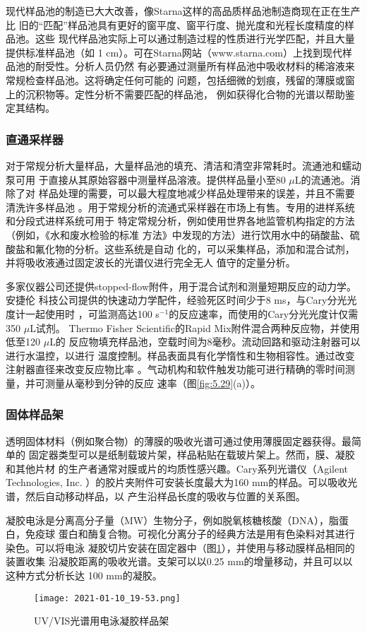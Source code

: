 现代样品池的制造已大大改善，像Starna这样的高品质样品池制造商现在正在生产比
旧的“匹配”样品池具有更好的窗平度、窗平行度、抛光度和光程长度精度的样品池。这些
现代样品池实际上可以通过制造过程的性质进行光学匹配，并且大量提供标准样品池（如
1 cm）。可在Starna网站（www.starna.com）上找到现代样品池的耐受性。分析人员仍然
有必要通过测量所有样品池中吸收材料的稀溶液来常规检查样品池。这将确定任何可能的
问题，包括细微的划痕，残留的薄膜或窗上的沉积物等。定性分析不需要匹配的样品池，
例如获得化合物的光谱以帮助鉴定其结构。
\subsubsection{直通采样器}
对于常规分析大量样品，大量样品池的填充、清洁和清空非常耗时。流通池和蠕动泵可用
于直接从其原始容器中测量样品溶液。提供样品量小至80 $\mu$L的流通池。消除了对
样品处理的需要，可以最大程度地减少样品处理带来的误差，并且不需要清洗许多样品池
。用于常规分析的流通式采样器在市场上有售。专用的进样系统和分段式进样系统可用于
特定常规分析，例如使用世界各地监管机构指定的方法（例如，《水和废水检验的标准
方法》中发现的方法）进行饮用水中的硝酸盐、硫酸盐和氟化物的分析。这些系统是自动
化的，可以采集样品，添加和混合试剂，并将吸收液通过固定波长的光谱仪进行完全无人
值守的定量分析。

多家仪器公司还提供stopped-flow附件，用于混合试剂和测量短期反应的动力学。安捷伦
科技公司提供的快速动力学配件，经验死区时间少于8 ms，与Cary分光光度计一起使用时
，可监测高达100 s$^{-1}$的反应速率，而使用的Cary分光光度计仅需350 $\mu$L试剂。
Thermo Fisher Scientific的Rapid Mix附件混合两种反应物，并使用低至120 $\mu$L的
反应物填充样品池，空载时间为8毫秒。流动回路和驱动注射器可以进行水温控，以进行
温度控制。样品表面具有化学惰性和生物相容性。通过改变注射器直径来改变反应物比率
。气动机构和软件触发功能可进行精确的零时间测量，并可测量从毫秒到分钟的反应
速率（图\ref{fig:5.29}(a)）。
\subsubsection{固体样品架}
透明固体材料（例如聚合物）的薄膜的吸收光谱可通过使用薄膜固定器获得。最简单的
固定器类型可以是纸制载玻片架，样品粘贴在载玻片架上。然而，膜、凝胶和其他片材
的生产者通常对膜或片的均质性感兴趣。Cary系列光谱仪（Agilent Technologies, Inc.
）的胶片夹附件可安装长度最大为160 mm的样品。可以吸收光谱，然后自动移动样品，以
产生沿样品长度的吸收与位置的关系图。

凝胶电泳是分离高分子量（MW）生物分子，例如脱氧核糖核酸（DNA），脂蛋白，免疫球
蛋白和酶复合物。可视化分离分子的经典方法是用有色染料对其进行染色。可以将电泳
凝胶切片安装在固定器中（图\ref{fig:5.28}），并使用与移动膜样品相同的装置收集
沿凝胶距离的吸收光谱。支架可以以0.25 mm的增量移动，并且可以以这种方式分析长达
100 mm的凝胶。
\begin{figure}[htpb]
    \centering
    \texttt{[image: 2021-01-10\_19-53.png]}
    \caption{UV/VIS光谱用电泳凝胶样品架}
    \label{fig:5.28}
\end{figure}

